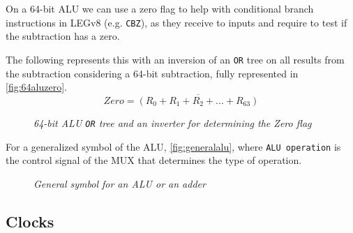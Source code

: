 \documentclass[11pt]{article}
\begin{document}
On a 64-bit ALU we can use a zero flag to help with conditional branch instructions in LEGv8 (e.g. \texttt{CBZ}), as they receive to inputs and require to test if the subtraction has a zero.

The following represents this with an inversion of an \texttt{OR} tree on all results from the subtraction considering a 64-bit subtraction, fully represented in \autoref{fig:64aluzero}.
\vspace{-1em}
$$Zero = \overline{(R_0 + R_1 + R_2 + ... + R_{63})}$$
\vspace{-3em}

\begin{figure}[htbp]
    \centering
    \caption{\textit{64-bit ALU \texttt{OR} tree and an inverter for determining the Zero flag}}
    \label{fig:64aluzero}
\end{figure}

For a generalized symbol of the ALU, \autoref{fig:generalalu}, where \texttt{ALU operation} is the control signal of the MUX that determines the type of operation.

\begin{figure}[htbp]
    \centering
    \caption{\textit{General symbol for an ALU or an adder}}
    \label{fig:generalalu}
\end{figure}

\pagebreak

\subsection*{Clocks}
\end{document}
